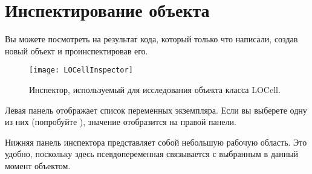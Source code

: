 \documentclass[a4paper,10pt,twoside]{book}
\begin{document}
\section{Инспектирование объекта}

Вы можете посмотреть на результат кода, который только что написали, создав новый объект  и проинспектировав его.


\begin{figure}[htbp]
   \centering
   \texttt{[image: LOCellInspector]} 
   \caption{Инспектор, используемый для исследования объекта класса LOCell.}
\end{figure}

Левая панель  отображает список переменных экземпляра. Если вы выберете одну из них (попробуйте \mbox{),} значение  отобразится на правой панели.


Нижняя панель инспектора представляет собой небольшую рабочую область. Это удобно, поскольку здесь псевдопеременная \self связывается с выбранным в данный момент объектом.
\end{document}
